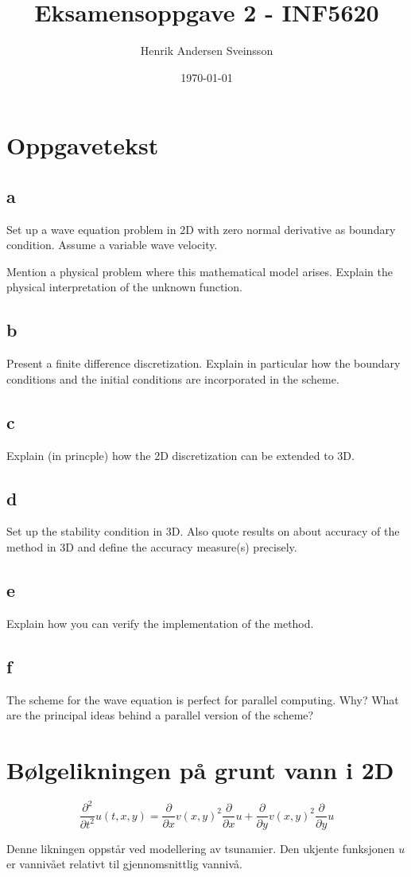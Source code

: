 \documentclass[a4paper, 10pt]{article}
\author{Henrik Andersen Sveinsson}
\title{Eksamensoppgave 2 - INF5620}
\date{\today}
\newcommand{\p}{\partial}
\begin{document}
\maketitle

\section{Oppgavetekst}

\subsection*{a}
 Set up a wave equation problem in 2D with zero normal derivative as boundary condition. Assume a variable wave velocity.

Mention a physical problem where this mathematical model arises. Explain the physical interpretation of the unknown function.
\subsection*{b}
 Present a finite difference discretization. Explain in particular how the boundary conditions and the initial conditions are incorporated in the scheme.
\subsection*{c}
 Explain (in princple) how the 2D discretization can be extended to 3D.
\subsection*{d}
 Set up the stability condition in 3D. Also quote results on about accuracy of the method in 3D and define the accuracy measure(s) precisely.
\subsection*{e}
 Explain how you can verify the implementation of the method.
\subsection*{f}
 The scheme for the wave equation is perfect for parallel computing. Why? What are the principal ideas behind a parallel version of the scheme? 

\section{Bølgelikningen på grunt vann i 2D}

\begin{equation}
	\frac{\p^2}{\p t^2} u(t, x, y) = \frac{\p}{\p x} v(x, y)^2 \frac{\p}{\p x} u + \frac{\p}{\p y} v(x, y)^2 \frac{\p}{\p y} u
\end{equation}

Denne likningen oppstår ved modellering av tsunamier. Den ukjente funksjonen $u$ er vannivået relativt til gjennomsnittlig vannivå. 
\end{document}
